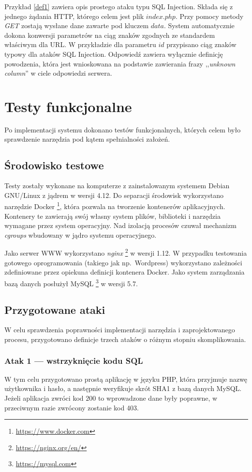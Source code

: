 \documentclass[11pt,a4paper,polish,thesis,oneside]{dcsbook}
\begin{document}
Przykład \ref{def1} zawiera opis prostego ataku typu SQL Injection. Składa się z jednego żądania HTTP, którego celem jest plik $index.php$. Przy pomocy metody \textit{GET} zostają wysłane dane zawarte pod kluczem $data$. System automatycznie dokona konwersji parametrów na ciąg znaków zgodnych ze standardem właściwym dla URL. W przykładzie dla parametru $id$ przypisano ciąg znaków typowy dla ataków SQL Injection.
Odpowiedź zawiera wyłącznie definicję powodzenia, która jest wnioskowana na podstawie zawierania frazy ,,\textit{unknown column}'' w ciele odpowiedzi serwera.


\chapter{Testy funkcjonalne}
Po implementacji systemu dokonano testów funkcjonalnych, których celem było sprawdzenie narzędzia pod kątem spełnialności założeń. 

\section{Środowisko testowe}
Testy zostały wykonane na komputerze z zainstalowanym systemem Debian GNU/Linux z jądrem w wersji 4.12. Do separacji środowisk wykorzystano narzędzie Docker \footnote{\url{https://www.docker.com}}, która pozwala na tworzenie kontenerów aplikacyjnych. Kontenery te zawierają swój własny system plików, biblioteki i narzędzia wymagane przez system operacyjny. Nad izolacją procesów czuwał mechanizm \textit{cgroups} wbudowany w jądro systemu operacyjnego.

Jako serwer WWW wykorzystano \textit{nginx} \footnote{\url{https://nginx.org/en/}} w wersji 1.12. W przypadku testowania gotowego oprogramowania (takiego jak np.~Wordpress) wykorzystano zależności zdefiniowane przez opiekuna definicji kontenera Docker. Jako system zarządzania bazą danych posłużył MySQL \footnote{\url{https://mysql.com}} w wersji 5.7.


\section{Przygotowane ataki}
W celu sprawdzenia poprawności implementacji narzędzia i zaprojektowanego procesu, przygotowano definicje trzech ataków o różnym stopniu skomplikowania. 

\subsection*{Atak 1 --- wstrzyknięcie kodu SQL}
W tym celu przygotowano prostą aplikację w języku PHP, która przyjmuje nazwę użytkownika i hasło, a następnie weryfikuje skrót SHA1 z bazą danych MySQL. Jeżeli aplikacja zwróci kod $200$ to wprowadzone dane były poprawne, w przeciwnym razie zwrócony zostanie kod 403.
\end{document}
